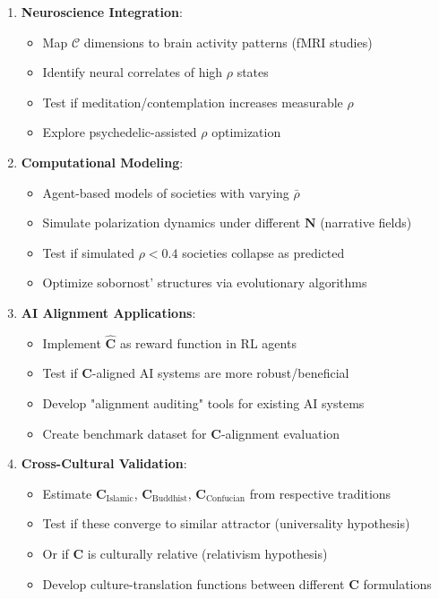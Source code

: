 \documentclass[11pt,a4paper]{article}
\theoremstyle{definition}
\theoremstyle{remark}
\newcommand{\CC}{\mathcal{C}}
\begin{document}
\begin{small}
\begin{enumerate}
\begin{enumerate}[leftmargin=*]
\item \textbf{Neuroscience Integration}:
    \begin{itemize}
        \item Map \(\CC\) dimensions to brain activity patterns (fMRI studies)
        \item Identify neural correlates of high \(\rho\) states
        \item Test if meditation/contemplation increases measurable \(\rho\)
        \item Explore psychedelic-assisted \(\rho\) optimization
    \end{itemize}

\item \textbf{Computational Modeling}:
    \begin{itemize}
        \item Agent-based models of societies with varying \(\bar{\rho}\)
        \item Simulate polarization dynamics under different \(\mathbf{N}\) (narrative fields)
        \item Test if simulated \(\rho < 0.4\) societies collapse as predicted
        \item Optimize sobornost' structures via evolutionary algorithms
    \end{itemize}

\item \textbf{AI Alignment Applications}:
    \begin{itemize}
        \item Implement \(\hat{\mathbf{C}}\) as reward function in RL agents
        \item Test if \(\mathbf{C}\)-aligned AI systems are more robust/beneficial
        \item Develop "alignment auditing" tools for existing AI systems
        \item Create benchmark dataset for \(\mathbf{C}\)-alignment evaluation
    \end{itemize}

\item \textbf{Cross-Cultural Validation}:
    \begin{itemize}
        \item Estimate \(\mathbf{C}_{\text{Islamic}}\), \(\mathbf{C}_{\text{Buddhist}}\), \(\mathbf{C}_{\text{Confucian}}\) from respective traditions
        \item Test if these converge to similar attractor (universality hypothesis)
        \item Or if \(\mathbf{C}\) is culturally relative (relativism hypothesis)
        \item Develop culture-translation functions between different \(\mathbf{C}\) formulations
    \end{itemize}


\end{enumerate}
\end{enumerate}
\end{small}
\end{document}
